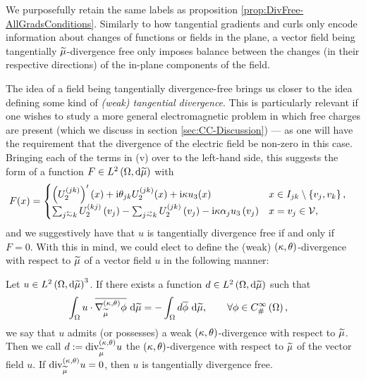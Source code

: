 We purposefully retain the same labels as proposition \ref{prop:DivFree-AllGradsConditions}.
Similarly to how tangential gradients and curls only encode information about changes of functions or fields in the plane, a vector field being tangentially $\widetilde{\mu}$-divergence free only imposes balance between the changes (in their respective directions) of the in-plane components of the field.

The idea of a field being tangentially divergence-free brings us closer to the idea defining some kind of \emph{(weak) tangential divergence}.
This is particularly relevant if one wishes to study a more general electromagnetic problem in which free charges are present (which we discuss in section \ref{sec:CC-Discussion}) --- as one will have the requirement that the divergence of the electric field be non-zero in this case.
Bringing each of the terms in (v) over to the left-hand side, this suggests the form of a function $F\in L^{2}\left( \Omega,\mathrm{d} \widetilde{\mu} \right)$ with
\begin{align} \label{eq:ktDivergence-Guess}
	F(x) &= 
	\begin{cases} 
		\bracs{U_2^{(jk)}}'(x) + \rmi\qm_{jk}U_2^{(jk)}(x) + \rmi\wavenumber u_3(x) &
		x\in I_{jk}\setminus\clbracs{v_j,v_k}, \\
		\sum_{j\conRight k}U_2^{(kj)}\bracs{v_j} - \sum_{j\conLeft k}U_2^{(jk)}\bracs{v_j} -\rmi\wavenumber\alpha_j u_3\bracs{v_j} &
		x=v_j\in\vertSet,
	\end{cases}
\end{align}
and we suggestively have that $u$ is tangentially divergence free if and only if $F=0$.
With this in mind, we could elect to define the (weak) $\left( \kappa, \theta \right)$-divergence with respect to $\widetilde{\mu}$ of a vector field $u$ in the following manner:
\begin{definition} \label{def:dddmesDivergence}
	Let $u\in L^{2}\left( \Omega,\mathrm{d} \widetilde{\mu} \right)^3$.
	If there exists a function $d\in L^{2}\left( \Omega,\mathrm{d} \widetilde{\mu} \right)$ such that
	\begin{align*}
		\int_{\Omega} u\cdot\overline{\nabla^{\left( \kappa, \theta \right)}_{\widetilde{\mu}}\phi}  \ \mathrm{d}\widetilde{\mu}
		&= -\int_{\Omega} d\overline{\phi}  \ \mathrm{d}\widetilde{\mu}, \qquad\forall\phi\in C^{\infty}_{\#}\left( \Omega \right),
	\end{align*}
	we say that $u$ admits (or possesses) a weak $\left( \kappa, \theta \right)$-divergence with respect to $\widetilde{\mu}$.
	Then we call $d:=\mathrm{div}_{\widetilde{\mu}}^{\left( \kappa, \theta \right)}u$ the $\left( \kappa, \theta \right)$-divergence with respect to $\widetilde{\mu}$ of the vector field $u$.
	If $\mathrm{div}_{\widetilde{\mu}}^{\left( \kappa, \theta \right)}u=0$, then $u$ is tangentially divergence free.
\end{definition}
